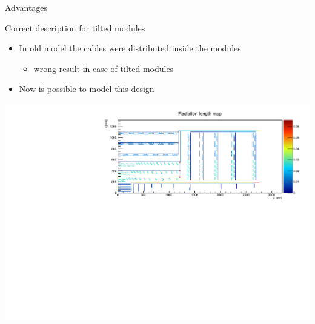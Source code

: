 \documentclass[pdftex, 11pt]{beamer}
\begin{document}
\begin{frame}{Advantages}
  \begin{block}{Correct description for \alert{tilted} modules}
    \begin{itemize}
    \item In old model the cables were distributed \alert{inside} the modules
      \begin{itemize}
      \item \alert{wrong} result in case of tilted modules
      \end{itemize}
      \pause
    \item Now is \alert{possible} to model this design
    \end{itemize}
  \end{block}
  \begin{center}
    \includegraphics[width=\textwidth]{img/tilted.pdf}
  \end{center}
\end{frame}
\end{document}
